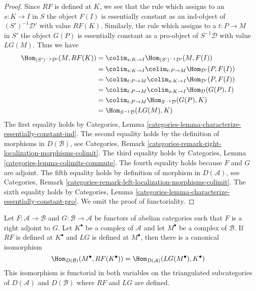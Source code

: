 \begin{proof}
Since $RF$ is defined at $K$, we see that the rule which assigns to an
$s : K \to I$ in $S$ the object $F(I)$ is essentially
constant as an ind-object of $(S')^{-1}\mathcal{D}'$ with value $RF(K)$.
Similarly, the rule which assigns to a $t : P \to M$ in $S'$
the object $G(P)$ is essentially constant as a pro-object of
$S^{-1}\mathcal{D}$ with value $LG(M)$. Thus we have
\begin{align*}
\Hom_{(S')^{-1}\mathcal{D}'}(M, RF(K))
& =
\colim_{s : K \to I} \Hom_{(S')^{-1}\mathcal{D}'}(M, F(I)) \\
& =
\colim_{s : K \to I} \colim_{t : P \to M} \Hom_{\mathcal{D}'}(P, F(I)) \\
& =
\colim_{t : P \to M} \colim_{s : K \to I} \Hom_{\mathcal{D}'}(P, F(I)) \\
& =
\colim_{t : P \to M} \colim_{s : K \to I} \Hom_{\mathcal{D}}(G(P), I) \\
& =
\colim_{t : P \to M} \Hom_{S^{-1}\mathcal{D}}(G(P), K) \\
& =
\Hom_{S^{-1}\mathcal{D}}(LG(M), K)
\end{align*}
The first equality holds by
Categories, Lemma \ref{categories-lemma-characterize-essentially-constant-ind}.
The second equality holds by the definition of morphisms in
$D(\mathcal{B})$, see Categories, Remark
\ref{categories-remark-right-localization-morphisms-colimit}.
The third equality holds by
Categories, Lemma \ref{categories-lemma-colimits-commute}.
The fourth equality holds because $F$ and $G$ are adjoint.
The fifth equality holds by definition of morphism
in $D(\mathcal{A})$, see Categories, Remark
\ref{categories-remark-left-localization-morphisms-colimit}.
The sixth equality holds by
Categories, Lemma \ref{categories-lemma-characterize-essentially-constant-pro}.
We omit the proof of functoriality.
\end{proof}

\begin{lemma}
\label{lemma-pre-derived-adjoint-functors}
Let $F : \mathcal{A} \to \mathcal{B}$ and $G : \mathcal{B} \to \mathcal{A}$
be functors of abelian categories such that $F$ is a right adjoint to $G$.
Let $K^\bullet$ be a complex of $\mathcal{A}$ and let $M^\bullet$ be
a complex of $\mathcal{B}$. If $RF$ is defined at $K^\bullet$
and $LG$ is defined at $M^\bullet$, then there is a canonical isomorphism
$$
\Hom_{D(\mathcal{B})}(M^\bullet, RF(K^\bullet)) =
\Hom_{D(\mathcal{A})}(LG(M^\bullet), K^\bullet)
$$
This isomorphism is functorial in both variables on the triangulated
subcategories of $D(\mathcal{A})$ and $D(\mathcal{B})$
where $RF$ and $LG$ are defined.
\end{lemma}

